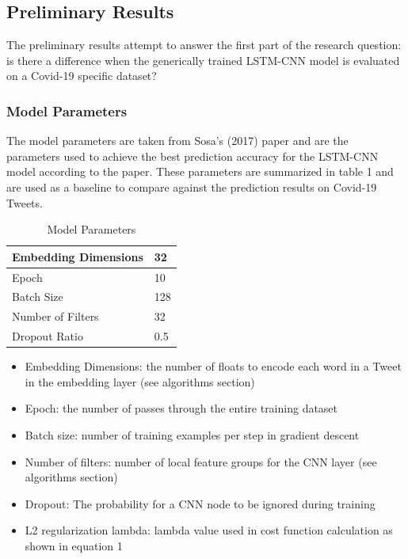 \documentclass[letterpaper]{article} %
\begin{document}
\subsection{Preliminary Results}
The preliminary results attempt to answer the first part of the research question: is there a difference when the generically trained LSTM-CNN model is evaluated on a Covid-19 specific dataset?

\subsubsection{Model Parameters}

The model parameters are taken from Sosa's (2017) paper and are the parameters used to achieve the best prediction accuracy for the LSTM-CNN model according to the paper. These parameters are summarized in table 1 and are used as a baseline to compare against the prediction results on Covid-19 Tweets.

\begin{table}
    \begin{tabularx}{\columnwidth}{|X|X|}
        \hline
        Embedding Dimensions & 32 \\ 
        \hline
        Epoch                    & 10       \\
        \hline
        Batch Size               & 128 \\
        \hline
        Number of Filters        & 32 \\
        \hline
        Dropout Ratio            & 0.5      \\
        \hline
    \end{tabularx}
    \caption{Model Parameters}
\end{table}

\begin{itemize}
  \item Embedding Dimensions: the number of floats to encode each word in a Tweet in the embedding layer (see algorithms section)
  \item Epoch: the number of passes through the entire training dataset
  \item Batch size: number of training examples per step in gradient descent
  \item Number of filters: number of local feature groups for the CNN layer (see algorithms section)
  \item Dropout: The probability for a CNN node to be ignored during training
  \item L2 regularization lambda: lambda value used in cost function calculation as shown in equation 1
\end{itemize}
\end{document}
